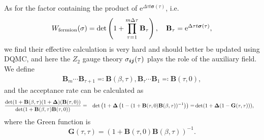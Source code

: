 \documentclass[hyperref, a4paper]{article}
\newcommand*{\ee}{\mathrm{e}}
\newcommand*{\Ztwo}{\texorpdfstring{$\mathbb{Z}_2$ }{Z2 }}
\def\\{}%
\def\mathbb#1{#1}%
\begin{document}
As for the factor containing the product of $\ee^{\Delta\tau t \bm{\sigma}(\tau)}$, i.e. 
\begin{equation}
    W_\text{fermion}(\sigma) = \det \left(1 + \prod_{\tau = 1}^{m\Delta \tau} \vb{B}_\tau \right), \quad \vb{B}_\tau =  \ee^{\Delta \tau t \bm{\sigma}(\tau)},
\end{equation}
we find their effective calculation is very hard and should better be updated using DQMC, and here the \Ztwo gauge theory $\sigma_{\vb*{i} \vb*{j}}(\tau)$ plays the role of the auxiliary field.
We define 
\begin{equation}
    \begin{gathered}
        \mathbf{B}_{m} \cdots \mathbf{B}_{\tau+1} \eqqcolon \mathbf{B}(\beta, \tau), \\
        \mathbf{B}_{\tau} \cdots \mathbf{B}_{1} \eqqcolon \mathbf{B}(\tau, 0),
    \end{gathered}
\end{equation}
and the acceptance rate can be calculated as 
\begin{equation}
    \begin{aligned}
        & \frac{\operatorname{det}(1+\mathbf{B}(\beta, \tau)(1+\vb{\Delta})(\mathbf{B}(\tau, 0))}{\operatorname{det}(1+\mathbf{B}(\beta, \tau) \mathbf{B}(\tau, 0))} \\
        =& \operatorname{det}\left(1+\vb{\Delta}\left(1-(1+\mathbf{B}(\tau, 0) \mathbf{B}(\beta, \tau))^{-1}\right)\right) \\
        =& \operatorname{det}(1+\vb{\Delta}(1-\mathbf{G}(\tau, \tau))),
    \end{aligned}
\end{equation}
where the Green function is 
\begin{equation}
    \mathbf{G}(\tau, \tau) = (1+\mathbf{B}(\tau, 0) \mathbf{B}(\beta, \tau))^{-1}.
    \label{eq:green-function-def}
\end{equation}
\end{document}
